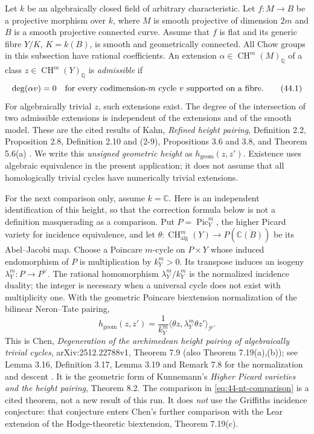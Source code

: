 \documentclass[11pt,a4paper]{article}
\theoremstyle{definition}
\theoremstyle{remark}
\begin{document}
Let $k$ be an algebraically closed field of arbitrary characteristic.
Let $f:M\to B$ be a projective morphism over $k$,
where $M$ is smooth projective of dimension $2m$ and $B$ is a smooth
projective connected curve.  Assume that $f$ is flat and its generic
fibre $Y/K$, $K=k(B)$, is smooth and geometrically connected.  All Chow
groups in this subsection have rational coefficients.  An extension
$\alpha\in\operatorname{CH}^{m}(M)_{\mathbb Q}$ of a class
$z\in\operatorname{CH}^{m}(Y)_{\mathbb Q}$ is \emph{admissible} if
\[
 \deg(\alpha v)=0
 \quad\hbox{for every codimension-$m$ cycle $v$ supported on a fibre.}
 \tag{44.1}\label{eq:44-admissible}
\]
For algebraically trivial $z$, such extensions exist.  The degree of the
intersection of two admissible extensions is independent of the
extensions and of the smooth model.  These are the cited results of
Kahn, \emph{Refined height pairing}, Definition 2.2, Proposition 2.8,
Definition 2.10 and (2-9), Propositions 3.6 and 3.8, and Theorem 5.6(a)
\cite{KahnHeight2024}.  We write this \emph{unsigned geometric height} as
$h_{\mathrm{geom}}(z,z')$.  Existence uses algebraic equivalence in the
present application; it does not assume that all homologically trivial
cycles have numerically trivial extensions.

For the next comparison only, assume $k=\mathbb C$.
Here is an independent identification of this height, so that the
correction formula below is not a definition masquerading as a
comparison.  Put $P=\operatorname{Pic}^{m}_{Y}$, the higher Picard variety
for incidence equivalence, and let
$\theta:\operatorname{CH}^{m}_{\mathrm{alg}}(Y)\to P(\overline{\mathbb C(B)})$
be its Abel--Jacobi map.  Choose a Poincare $m$-cycle on $P\times Y$
whose induced endomorphism of $P$ is multiplication by $k_Y^m>0$.
Its transpose induces an isogeny $\lambda_Y^m:P\to P^\vee$.
The rational homomorphism $\lambda_Y^m/k_Y^m$ is the normalized
incidence duality; the integer is necessary when a universal cycle
does not exist with multiplicity one.  With the geometric Poincare
biextension normalization of the bilinear Neron--Tate pairing,
\[
 h_{\mathrm{geom}}(z,z')
 =\frac{1}{k_Y^m}
    \big\langle\theta z,\lambda_Y^m\theta z'\big\rangle_{\mathcal P}.
 \tag{44.2}\label{eq:44-nt-comparison}
\]
This is Chen, \emph{Degeneration of the archimedean height pairing of
algebraically trivial cycles}, arXiv:2512.22788v1, Theorem 7.9
(also Theorem 7.19(a),(b)); see Lemma 3.16, Definition 3.17,
Lemma 3.19 and Remark 7.8 for the normalization and descent
\cite{ChenHeight2025}.  It is the geometric form of Kunnemann's
\emph{Higher Picard varieties and the height pairing}, Theorem 8.2.
The comparison in \eqref{eq:44-nt-comparison} is a cited theorem, not a
new result of this run.  It does \emph{not} use the Griffiths incidence
conjecture: that conjecture enters Chen's further comparison with the
Lear extension of the Hodge-theoretic biextension, Theorem 7.19(c).
\end{document}
